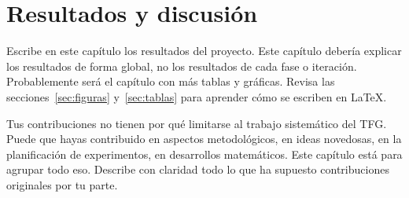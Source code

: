 \chapter{Resultados y discusión}
\label{ch:resultados}

\avisoLocalizacionArchivo 

Escribe en este capítulo los resultados del proyecto.  Este capítulo debería explicar los resultados de forma global, no los resultados de cada fase o iteración.  Probablemente será el capítulo con más tablas y gráficas.  Revisa las secciones~\ref{sec:figuras} y~\ref{sec:tablas} para aprender cómo se escriben en \LaTeX{}.

Tus contribuciones no tienen por qué limitarse al trabajo sistemático del TFG.  Puede que hayas contribuido en aspectos metodológicos, en ideas novedosas, en la planificación de experimentos, en desarrollos matemáticos. Este capítulo está para agrupar todo eso.  Describe con claridad todo lo que ha supuesto contribuciones originales por tu parte.

